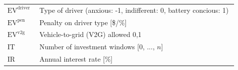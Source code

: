 \documentclass[11pt]{article}
\begin{document}
\begin{center}
\begin{tabular}{p{0.12\linewidth}p{0.8\linewidth}}
\(\text{EV}^\text{driver}\) & Type of driver (anxious: -1, indifferent: 0, battery concious: 1) \\
\(\text{EV}^\text{pen}\) & Penalty on driver type [\$/\%] \\
\(\text{EV}^\text{v2g}\) & Vehicle-to-grid (V2G) allowed {0,1} \\
\(\text{IT}\) & Number of investment windows [0, ..., \(n\)] \\
\(\text{IR}\) & Annual interest rate [\%] \\
\hline
\end{tabular}
\captionsetup{type=table}
\label{tab:general_parameters}
\end{center}

\end{document}
